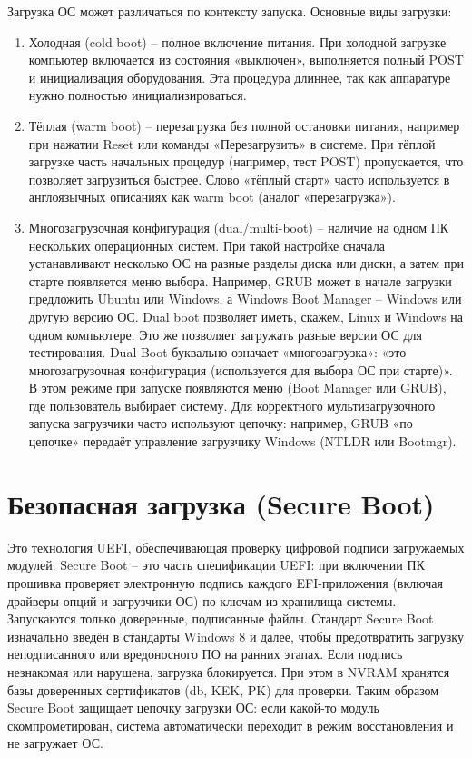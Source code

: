 Загрузка ОС может различаться по контексту запуска. Основные виды
загрузки:

\begin{enumerate}
\def\labelenumi{\arabic{enumi}.}
\item
  Холодная (cold boot) -- полное включение питания. При холодной
  загрузке компьютер включается из состояния «выключен», выполняется
  полный POST и инициализация оборудования. Эта процедура длиннее, так
  как аппаратуре нужно полностью инициализироваться.
\item
  Тёплая (warm boot) -- перезагрузка без полной остановки питания,
  например при нажатии Reset или команды «Перезагрузить» в системе. При
  тёплой загрузке часть начальных процедур (например, тест POST)
  пропускается, что позволяет загрузиться быстрее. Слово «тёплый старт»
  часто используется в англоязычных описаниях как warm boot (аналог
  «перезагрузка»).
\item
  Многозагрузочная конфигурация (dual/multi-boot) -- наличие на одном ПК
  нескольких операционных систем. При такой настройке сначала
  устанавливают несколько ОС на разные разделы диска или диски, а затем
  при старте появляется меню выбора. Например, GRUB может в начале
  загрузки предложить Ubuntu или Windows, а Windows Boot Manager --
  Windows или другую версию ОС. Dual boot позволяет иметь, скажем, Linux
  и Windows на одном компьютере. Это же позволяет загружать разные
  версии ОС для тестирования. Dual Boot буквально означает
  «многозагрузка»: «это многозагрузочная конфигурация (используется для
  выбора ОС при старте)». В этом режиме при запуске появляются меню
  (Boot Manager или GRUB), где пользователь выбирает систему. Для
  корректного мультизагрузочного запуска загрузчики часто используют
  цепочку: например, GRUB «по цепочке» передаёт управление загрузчику
  Windows (NTLDR или Bootmgr).
\end{enumerate}

\hypertarget{ux431ux435ux437ux43eux43fux430ux441ux43dux430ux44f-ux437ux430ux433ux440ux443ux437ux43aux430-secure-boot}{%
\chapter{Безопасная загрузка (Secure
Boot)}\label{ux431ux435ux437ux43eux43fux430ux441ux43dux430ux44f-ux437ux430ux433ux440ux443ux437ux43aux430-secure-boot}}

Это технология UEFI, обеспечивающая проверку цифровой подписи
загружаемых модулей. Secure Boot -- это часть спецификации UEFI: при
включении ПК прошивка проверяет электронную подпись каждого
EFI-приложения (включая драйверы опций и загрузчики ОС) по ключам из
хранилища системы. Запускаются только доверенные, подписанные файлы.
Стандарт Secure Boot изначально введён в стандарты Windows 8 и далее,
чтобы предотвратить загрузку неподписанного или вредоносного ПО на
ранних этапах. Если подпись незнакомая или нарушена, загрузка
блокируется. При этом в NVRAM хранятся базы доверенных сертификатов (db,
KEK, PK) для проверки. Таким образом Secure Boot защищает цепочку
загрузки ОС: если какой-то модуль скомпрометирован, система
автоматически переходит в режим восстановления и не загружает ОС.

